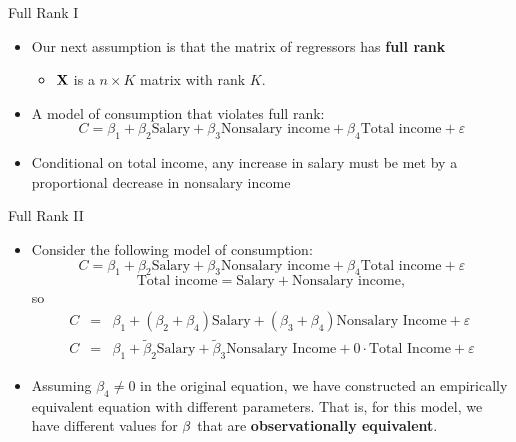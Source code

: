 \begin{frame}{Full Rank I}
\begin{itemize}

	\item<1-> Our next assumption is that the matrix of regressors has {\bf full rank}
	\begin{itemize}
		\item<1-> ${\bf X}$ is a $n\times K$ matrix with rank $K$.
	\end{itemize}

	\medskip
	\item<2-> A model of consumption that violates full rank:\[ 
	C = \beta_1 + \beta_2 \text{Salary} + \beta_3 \text{Nonsalary income} + \beta_4 \text{Total income} + \varepsilon
	\]

	\medskip
	\item<3-> Conditional on total income, any increase in salary must be met by a proportional decrease
	in nonsalary income


\end{itemize}
\end{frame}

\begin{frame}{Full Rank II}
\begin{itemize}

	\item Consider the following model of consumption:\[ 
	C = \beta_1 + \beta_2 \text{Salary} + \beta_3 \text{Nonsalary income} + \beta_4 \text{Total income} + \varepsilon
	\]
	\smallskip
\[
	\text{Total income}  = \text{Salary} + \text{Nonsalary income},
	\]
	so\[
\begin{array}{ccl}
C & = & \beta_{1}+\left(\beta_{2}+\beta_{4}\right)\text{Salary}+\left(\beta_{3}+\beta_{4}\right)\text{Nonsalary Income}+\varepsilon\\
C & = & \beta_{1}+\widetilde{\beta}_{2}\text{Salary}+\widetilde{\beta}_{3}\text{Nonsalary Income}+0\cdot\text{Total Income}+\varepsilon
\end{array}
\]

	\smallskip
	\item Assuming $\beta_{4}\ne 0$ in the original equation, we have constructed an empirically equivalent equation with different parameters.
         That is, for this model, we have different values for ${\bold \beta }$ that are {\bf observationally equivalent}. 

\end{itemize}
\end{frame}


